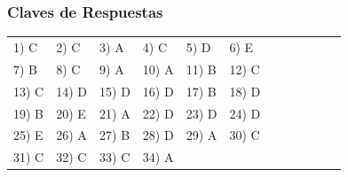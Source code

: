 \subsubsection*{Claves de Respuestas}

\begin{center}
	\begin{tabular}{ll ll ll ll ll ll}
		1) C & 2) C & 3) A & 4) C & 5) D & 6) E \\
		7) B & 8) C & 9) A & 10) A & 11) B & 12) C \\
		13) C & 14) D & 15) D & 16) D & 17) B & 18) D \\
		19) B & 20) E & 21) A & 22) D & 23) D & 24) D \\
		25) E & 26) A & 27) B & 28) D & 29) A & 30) C \\
		31) C & 32) C & 33) C & 34) A & & \\
	\end{tabular}
\end{center}


